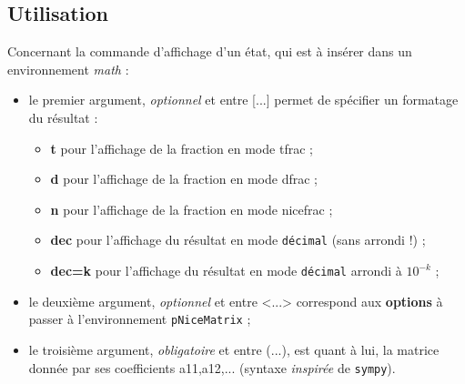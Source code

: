 \documentclass[french,a4paper,11pt]{article}
\newcommand\Cle[1]{{\bfseries\sffamily\textlangle #1\textrangle}}
\begin{document}
\subsection{Utilisation}

\begin{tipblock}
Concernant la commande d'affichage d'un état, qui est à insérer dans un environnement \textit{math} :

\begin{itemize}
	\item le premier argument, \textit{optionnel} et entre \textsf{[...]} permet de spécifier un formatage du résultat :
	\begin{itemize}
		\item \Cle{t} pour l'affichage de la fraction en mode \textsf{tfrac} ;
		\item \Cle{d} pour l'affichage de la fraction en mode \textsf{dfrac} ;
		\item \Cle{n} pour l'affichage de la fraction en mode \textsf{nicefrac} ;
		\item \Cle{dec} pour l'affichage du résultat en mode \texttt{décimal} (sans arrondi !) ;
		\item \Cle{dec=k} pour l'affichage du résultat en mode \texttt{décimal} arrondi à $10^{-k}$ ;
	\end{itemize}
	\item le deuxième argument, \textit{optionnel} et entre \textsf{<...>} correspond aux \Cle{options} à passer à l'environnement \texttt{pNiceMatrix} ;
	\item le troisième argument, \textit{obligatoire} et entre \textsf{(...)}, est quant à lui, la matrice donnée par ses coefficients \textsf{a11,a12,...} (syntaxe \textit{inspirée} de \texttt{sympy}).
\end{itemize}
\vspace*{-\baselineskip}\leavevmode
\end{tipblock}
\end{document}
